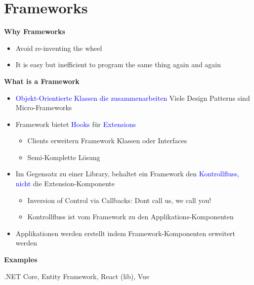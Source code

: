 \section{Frameworks}
\textbf{Why Frameworks}
\begin{itemize}
    \item Avoid re-inventing the wheel
    \item It is easy but inefficient to program the same thing again and again
\end{itemize}
\vspace{10pt}
\textbf{What is a Framework}
\begin{itemize}
    \item \textcolor{blue}{Objekt-Orientierte Klassen die zusammenarbeiten} Viele Design Patterns sind Micro-Frameworks
    \item Framework bietet \textcolor{blue}{Hooks} für \textcolor{blue}{Extensions}
    \begin{itemize}
        \item Clients erweitern Framework Klassen oder Interfaces
        \item Semi-Komplette Lösung
    \end{itemize}
    \item Im Gegensatz zu einer Library, behaltet ein Framework den \textcolor{blue}{Kontrollfluss, nicht} die Extension-Komponente
    \begin{itemize}
        \item Inversion of Control via Callbacks: Dont call us, we call you!
        \item Kontrollfluss ist vom Framework zu den Applikations-Komponenten
    \end{itemize}
    \item Applikationen werden erstellt indem Framework-Komponenten erweitert werden
\end{itemize}
\vspace{10pt}
\textbf{Examples}

.NET Core, Entity Framework, React (lib), Vue

